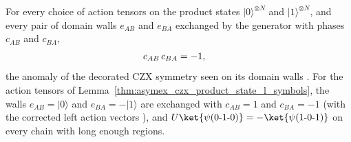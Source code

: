 \begin{lemma}
    \label{thm:asymex_czx_domain_walls}
    \leanok
    For every choice of action tensors on the product states
    $|0\rangle^{\otimes N}$ and $|1\rangle^{\otimes N}$, and every pair of
    domain walls $e_{AB}$ and $e_{BA}$ exchanged by the generator with
    phases $c_{AB}$ and $c_{BA}$,
    \begin{align}
        c_{AB}\,c_{BA} & =-1,
        \notag
    \end{align}
    the anomaly of the decorated CZX symmetry seen on its domain walls
    \cite[Section~III]{GarreRubioSchuch2024DomainWall}. For the action tensors
    of Lemma~\ref{thm:asymex_czx_product_state_l_symbols}, the walls
    $e_{AB}=|0\rangle$ and $e_{BA}=-|1\rangle$ are exchanged with
    $c_{AB}=1$ and $c_{BA}=-1$ (with the corrected left action vectors
    \cite{gap:gs24_czx_action_left_vectors}), and
    $U\ket{\psi(0\text{-}1\text{-}0)}=-\ket{\psi(1\text{-}0\text{-}1)}$ on
    every chain with long enough regions.
\end{lemma}

